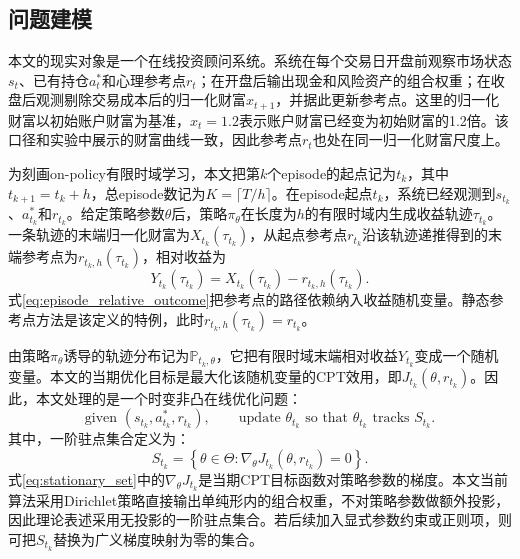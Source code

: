 \subsection{问题建模}

本文的现实对象是一个在线投资顾问系统。系统在每个交易日开盘前观察市场状态$s_t$、已有持仓$a_t^*$和心理参考点$r_t$；在开盘后输出现金和风险资产的组合权重；在收盘后观测剔除交易成本后的归一化财富$x_{t+1}$，并据此更新参考点。这里的归一化财富以初始账户财富为基准，$x_t=1.2$表示账户财富已经变为初始财富的1.2倍。该口径和实验中展示的财富曲线一致，因此参考点$r_t$也处在同一归一化财富尺度上。

为刻画on-policy有限时域学习，本文把第$k$个episode的起点记为$t_k$，其中$t_{k+1}=t_k+h$，总episode数记为$K=\lceil T/h\rceil$。在episode起点$t_k$，系统已经观测到$s_{t_k}$、$a_{t_k}^*$和$r_{t_k}$。给定策略参数$\theta$后，策略$\pi_\theta$在长度为$h$的有限时域内生成收益轨迹$\tau_{t_k}$。一条轨迹的末端归一化财富为$X_{t_k}(\tau_{t_k})$，从起点参考点$r_{t_k}$沿该轨迹递推得到的末端参考点为$r_{t_k,h}(\tau_{t_k})$，相对收益为
\begin{equation}
\label{eq:episode_relative_outcome}
Y_{t_k}(\tau_{t_k})
=
X_{t_k}(\tau_{t_k})
-
r_{t_k,h}(\tau_{t_k}).
\end{equation}
式\eqref{eq:episode_relative_outcome}把参考点的路径依赖纳入收益随机变量。静态参考点方法是该定义的特例，此时$r_{t_k,h}(\tau_{t_k})=r_{t_k}$。

由策略$\pi_\theta$诱导的轨迹分布记为$\mathbb{P}_{t_k,\theta}$，它把有限时域末端相对收益$Y_{t_k}$变成一个随机变量。本文的当期优化目标是最大化该随机变量的CPT效用，即$J_{t_k}(\theta,r_{t_k})$。因此，本文处理的是一个时变非凸在线优化问题：
\begin{equation}
\label{eq:online_problem}
\text{given } (s_{t_k},a_{t_k}^*,r_{t_k}),\qquad
\text{update }\theta_{t_k}\text{ so that }\theta_{t_k}\text{ tracks }S_{t_k}.
\end{equation}
其中，一阶驻点集合定义为：
\begin{equation}
\label{eq:stationary_set}
S_{t_k}
=
\left\{
\theta\in\Theta:
\nabla_\theta J_{t_k}(\theta,r_{t_k})=0
\right\}.
\end{equation}
式\eqref{eq:stationary_set}中的$\nabla_\theta J_{t_k}$是当期CPT目标函数对策略参数的梯度。本文当前算法采用Dirichlet策略直接输出单纯形内的组合权重，不对策略参数做额外投影，因此理论表述采用无投影的一阶驻点集合。若后续加入显式参数约束或正则项，则可把$S_{t_k}$替换为广义梯度映射为零的集合。

